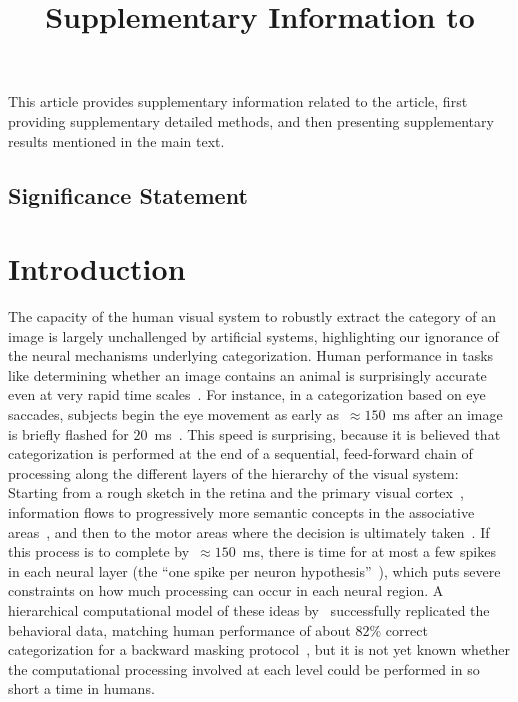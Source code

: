 \documentclass[a4paper]{article}
\title{Supplementary Information to \\ \textit{\Title}}%
\author[1]{\AuthorA }%
\author[2]{\AuthorB }
\affil[1]{\AddressA}
\affil[2]{\AddressB}
\date{}
\newcommand{\hide}[1]{}
\begin{document}
%
\maketitle%

This article provides supplementary information related to the article,
first providing supplementary detailed methods, and then presenting
supplementary results mentioned in the main text.

\subsection*{Significance Statement}%
\noindent \SignificanceStatement %

\section{Introduction}%
The capacity of the human visual system to robustly extract the category of an image 
is largely unchallenged by artificial systems, 
highlighting our ignorance of the neural mechanisms underlying categorization. 
Human performance in tasks like determining whether an image contains an animal is
surprisingly accurate even at very rapid time scales~\autocite{Thorpe96}. 
For instance, in a categorization based on eye saccades, 
subjects begin the eye movement as early as~$\approx 150$~ms 
after an image is briefly flashed for $20$~ms~\autocite{Kirchner06}. 
This speed is surprising, because it is believed that categorization is performed 
at the end of a sequential, feed-forward chain of processing 
along the different layers of the hierarchy of the visual system:
Starting from a rough sketch in the retina and the primary visual cortex~\autocite{Serre10}, 
information flows to progressively more semantic concepts in the associative areas~\autocite{Freedman01}, 
and then to the motor areas where the decision is ultimately taken~\autocite{Riesenhuber00}.  
If this process is to complete by~$\approx 150$~ms, 
there is time for at most a few spikes in each neural layer 
(the ``one spike per neuron hypothesis''~\autocite{Rullen98}), 
which puts severe constraints on how much processing can occur in each neural region.  
A hierarchical computational model of these ideas by~\textcite{Serre07} 
successfully replicated the behavioral data,
matching human performance of about $82\%$ correct categorization 
for a backward masking protocol~\autocite{Bacon05}, 
but it is not yet known whether the computational processing involved at each level 
could be performed in so short a time in humans. 
\end{document}

